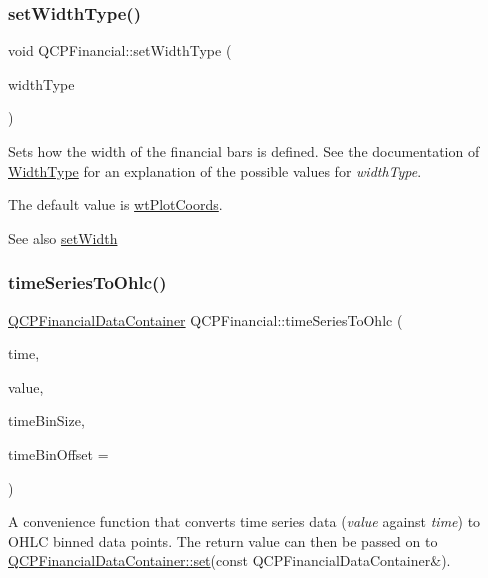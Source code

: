 \subsubsection{\texorpdfstring{set\+Width\+Type()}{setWidthType()}}
{\footnotesize\ttfamily void Q\+C\+P\+Financial\+::set\+Width\+Type (\begin{DoxyParamCaption}\item[{\hyperlink{classQCPFinancial_aef1761dda71a53dc5269685e9e492626}{Q\+C\+P\+Financial\+::\+Width\+Type}}]{width\+Type }\end{DoxyParamCaption})}

Sets how the width of the financial bars is defined. See the documentation of \hyperlink{classQCPFinancial_aef1761dda71a53dc5269685e9e492626}{Width\+Type} for an explanation of the possible values for {\itshape width\+Type}.

The default value is \hyperlink{classQCPFinancial_aef1761dda71a53dc5269685e9e492626af676bc8dbe700b96b333329c9dbfc30f}{wt\+Plot\+Coords}.

\begin{DoxySeeAlso}{See also}
\hyperlink{classQCPFinancial_a99633f8bac86a61d534ae5eeb1a3068f}{set\+Width} 
\end{DoxySeeAlso}
\mbox{\label{classQCPFinancial_a9a058c035040d3939b8884f4aaccb1a7}} 
\subsubsection{\texorpdfstring{time\+Series\+To\+Ohlc()}{timeSeriesToOhlc()}}
{\footnotesize\ttfamily \hyperlink{classQCPDataContainer}{Q\+C\+P\+Financial\+Data\+Container} Q\+C\+P\+Financial\+::time\+Series\+To\+Ohlc (\begin{DoxyParamCaption}\item[{const Q\+Vector$<$ double $>$ \&}]{time,  }\item[{const Q\+Vector$<$ double $>$ \&}]{value,  }\item[{double}]{time\+Bin\+Size,  }\item[{double}]{time\+Bin\+Offset = {} }\end{DoxyParamCaption})\hspace{0.3cm}{\ttfamily [static]}}

A convenience function that converts time series data ({\itshape value} against {\itshape time}) to O\+H\+LC binned data points. The return value can then be passed on to \hyperlink{classQCPDataContainer_ae7042bd534fc3ce7befa2ce3f790b5bf}{Q\+C\+P\+Financial\+Data\+Container\+::set}(const Q\+C\+P\+Financial\+Data\+Container\&).

